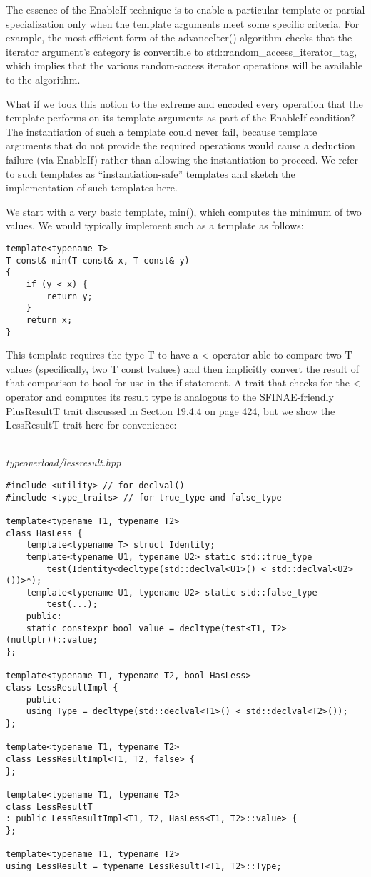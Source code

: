 The essence of the EnableIf technique is to enable a particular template or partial specialization only when the template arguments meet some specific criteria. For example, the most efficient form of the advanceIter() algorithm checks that the iterator argument’s category is convertible to std::random\_access\_iterator\_tag, which implies that the  various random-access iterator operations will be available to the algorithm.

What if we took this notion to the extreme and encoded every operation that the template performs on its template arguments as part of the EnableIf condition? The instantiation of such a template could never fail, because template arguments that do not provide the required operations would cause a deduction failure (via EnableIf) rather than allowing the instantiation to proceed. We refer to such templates as “instantiation-safe” templates and sketch the implementation of such templates here.

We start with a very basic template, min(), which computes the minimum of two values. We would typically implement such as a template as follows:

\begin{lstlisting}[style=styleCXX]
template<typename T>
T const& min(T const& x, T const& y)
{
	if (y < x) {
		return y;
	}
	return x;
}
\end{lstlisting}

This template requires the type T to have a < operator able to compare two T values (specifically, two T const lvalues) and then implicitly convert the result of that comparison to bool for use in the if statement. A trait that checks for the < operator and computes its result type is analogous to the SFINAE-friendly PlusResultT trait discussed in Section 19.4.4 on page 424, but we show the LessResultT trait here for convenience:

\hspace*{\fill} \\ %
\noindent
\textit{typeoverload/lessresult.hpp}
\begin{lstlisting}[style=styleCXX]
#include <utility> // for declval()
#include <type_traits> // for true_type and false_type

template<typename T1, typename T2>
class HasLess {
	template<typename T> struct Identity;
	template<typename U1, typename U2> static std::true_type
		test(Identity<decltype(std::declval<U1>() < std::declval<U2>())>*);
	template<typename U1, typename U2> static std::false_type
		test(...);
	public:
	static constexpr bool value = decltype(test<T1, T2>(nullptr))::value;
};

template<typename T1, typename T2, bool HasLess>
class LessResultImpl {
	public:
	using Type = decltype(std::declval<T1>() < std::declval<T2>());
};

template<typename T1, typename T2>
class LessResultImpl<T1, T2, false> {
};

template<typename T1, typename T2>
class LessResultT
: public LessResultImpl<T1, T2, HasLess<T1, T2>::value> {
};

template<typename T1, typename T2>
using LessResult = typename LessResultT<T1, T2>::Type;
\end{lstlisting}

